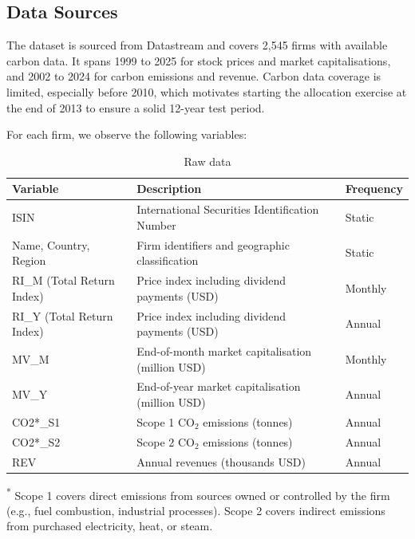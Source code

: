 \documentclass[11pt,a4paper]{article}
\begin{document}
\subsection{Data Sources}

The dataset is sourced from Datastream and covers 2,545 firms with available carbon data. It spans 1999 to 2025 for stock prices and market capitalisations, and 2002 to 2024 for carbon emissions and revenue. Carbon data coverage is limited, especially before 2010, which motivates starting the allocation exercise at the end of 2013 to ensure a solid 12-year test period.

For each firm, we observe the following variables:

\begin{table}[H]
    \centering
    \caption{Raw data}
    \begin{tabularx}{\textwidth}{>{\raggedright\arraybackslash}p{3.2cm} X >{\raggedright\arraybackslash}p{2.3cm}}
        \toprule
        \textbf{Variable} & \textbf{Description} & \textbf{Frequency} \\
        \midrule
        ISIN & International Securities Identification Number & Static \\
        Name, Country, Region & Firm identifiers and geographic classification & Static \\
        RI\_M (Total Return Index) & Price index including dividend payments (USD) & Monthly \\
        RI\_Y (Total Return Index) & Price index including dividend payments (USD) & Annual \\
        MV\_M & End-of-month market capitalisation (million USD) & Monthly \\
        MV\_Y & End-of-year market capitalisation (million USD) & Annual \\
        CO2*\_S1 & Scope 1 CO\(_2\) emissions (tonnes) & Annual \\
        CO2*\_S2 & Scope 2 CO\(_2\) emissions (tonnes) & Annual \\
        REV & Annual revenues (thousands USD) & Annual \\
        \bottomrule
    \end{tabularx}
    \vspace{0.5em}
    \par
    {\raggedright\footnotesize\textsuperscript{*} Scope 1 covers direct emissions from sources owned or controlled by the firm (e.g., fuel combustion, industrial processes). Scope 2 covers indirect emissions from purchased electricity, heat, or steam.\par}
\end{table}
\end{document}
